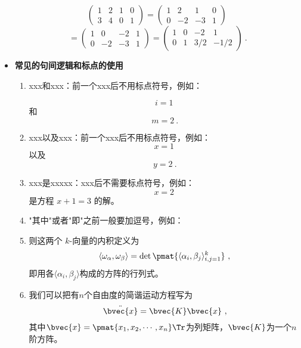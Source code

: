 \begin{itemize}
$$
\left(
    \begin{matrix}
    1&2&1&0\\
    3&4&0&1
    \end{matrix}\right)=\left(
    \begin{matrix}
    1&2&1&0\\
    0&-2&-3&1
    \end{matrix}\right)~$$
    $$
    =\left(
    \begin{matrix}
    1&0&-2&1\\
    0&-2&-3&1
    \end{matrix}\right)=\left(
    \begin{matrix}
    1&0&-2&1\\
    0&1&3/2&-1/2
    \end{matrix}
\right)~.
$$

\item \textbf{常见的句间逻辑和标点的使用}

\begin{enumerate}
\item xxx和xxx：前一个xxx后不用标点符号，例如：

\begin{equation}
i=1~
\end{equation}
和
\begin{equation}
m=2~.
\end{equation}
\item xxx以及xxx：前一个xxx后不用标点符号，例如：
\begin{equation}
x=1~
\end{equation}
以及
\begin{equation}
y=2~.
\end{equation}

 \item xxx是xxxxx：xxx后不需要标点符号，例如：
\begin{equation}
x=2~
\end{equation}
是方程 $x+1=3$ 的解。
\item "其中"或者"即"之前一般要加逗号，例如：

\item 则这两个 $k$-向量的内积定义为
\begin{equation}
\langle\omega_\alpha, \omega_\beta\rangle = \det \pmat{\langle \alpha_i, \beta_j \rangle_{i, j=1}^k}~,
\end{equation}
即用各$\langle \alpha_i, \beta_j \rangle$构成的方阵的行列式。

\item 
我们可以把有$n$个自由度的简谐运动方程写为
\begin{equation}
\ddot{\bvec{x}} = \bvec{K}\bvec{x}~,
\end{equation}
其中$\bvec{x}=\pmat{x_1, x_2, \cdots, x_n}\Tr$为列矩阵，$\bvec{K}$为一个$n$阶方阵。


\end{enumerate}
\end{itemize}
